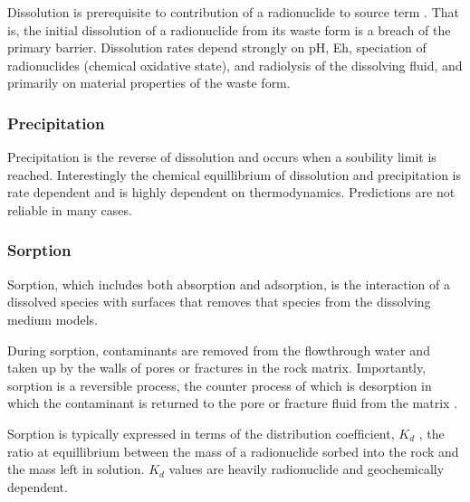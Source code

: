 Dissolution is prerequisite to contribution of a radionuclide to source term 
\cite{bracke_safety_2008}. That is, the initial 
dissolution of a radionuclide from its waste form is a breach of the primary
barrier. Dissolution rates depend strongly on pH, Eh,
speciation of radionuclides (chemical oxidative state), and radiolysis of the
dissolving fluid, and primarily on material properties of the waste form.


\subsubsection{Precipitation}

Precipitation is the reverse of dissolution and occurs when a soubility limit
is reached. Interestingly the chemical equillibrium of dissolution and
precipitation is rate dependent and is highly dependent on thermodynamics.
Predictions are not reliable in many cases.

\subsubsection{Sorption}

Sorption, which includes both absorption and adsorption,  is the interaction of a
dissolved species with surfaces that removes that species from the dissolving
medium models.

During sorption, contaminants are removed from the flowthrough water and taken up 
by the walls of pores or fractures in the rock matrix. Importantly, sorption is a 
reversible process, the  counter process of which is desorption in which the 
contaminant is returned to the pore or fracture fluid from the matrix 
 \cite{ahn_mass_1988} . 

Sorption is typically expressed in terms of the distribution coefﬁcient, $K_d$ , 
the ratio at equillibrium between the mass of a radionuclide sorbed into the 
rock and the mass left in solution. $K_d$ values are heavily radionuclide and 
geochemically dependent.  





